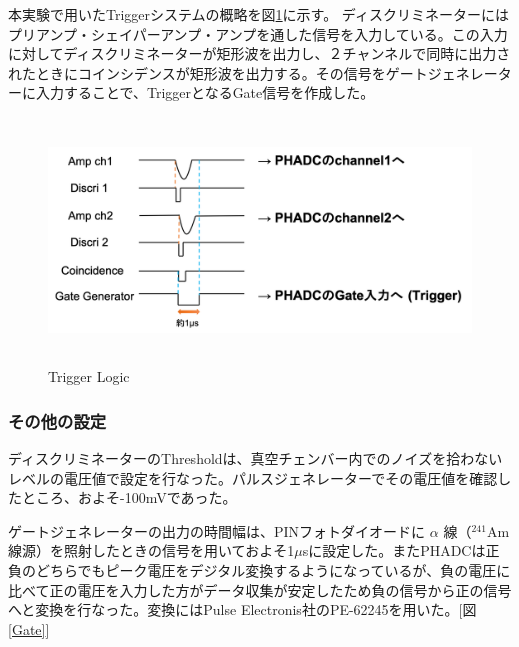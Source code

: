 \documentclass[a4paper,11pt,dvipdfmx]{jsarticle}
\begin{document}
\noindent
本実験で用いたTriggerシステムの概略を図\ref{Logic}に示す。
ディスクリミネーターにはプリアンプ・シェイパーアンプ・アンプを通した信号を入力している。この入力に対してディスクリミネーターが矩形波を出力し、２チャンネルで同時に出力されたときにコインシデンスが矩形波を出力する。その信号をゲートジェネレーターに入力することで、TriggerとなるGate信号を作成した。

\vspace*{5mm}

\begin{figure}[H]
\centering
\includegraphics[width=150mm,height=65mm]{picture/daq/Trigger.png}
\caption{Trigger Logic}
\label{Logic}
\end{figure}

\newpage
\subsubsection{その他の設定}
ディスクリミネーターのThresholdは、真空チェンバー内でのノイズを拾わないレベルの電圧値で設定を行なった。パルスジェネレーターでその電圧値を確認したところ、およそ-100mVであった。

ゲートジェネレーターの出力の時間幅は、PINフォトダイオードに $\alpha$ 線（$^{241}\mathrm{Am}$線源）を照射したときの信号を用いておよそ1$\mu$sに設定した。またPHADCは正負のどちらでもピーク電圧をデジタル変換するようになっているが、負の電圧に比べて正の電圧を入力した方がデータ収集が安定したため負の信号から正の信号へと変換を行なった。変換にはPulse Electronis社のPE-62245を用いた。[図\ref{Gate}]

\vspace*{5mm}
\end{document}
